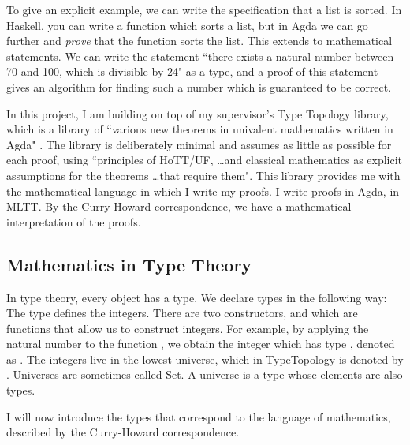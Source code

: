 \documentclass[ProjectReport]{subfiles}
\begin{document}
To give an explicit example, we can write the specification that a list is sorted. In Haskell, you can write a function which sorts a list, but in Agda we can go further and \textit{prove} that the function sorts the list. This extends to mathematical statements. We can write the statement ``there exists a natural number between 70 and 100, which is divisible by 24" as a type, and a proof of this statement gives an algorithm for finding such a number which is guaranteed to be correct.

In this project, I am building on top of my supervisor's Type Topology library, which is a library of ``various new theorems in univalent mathematics written in Agda" \cite{TypeTopology}. The library is deliberately minimal and assumes as little as possible for each proof, using ``principles of HoTT/UF, \ldots and classical mathematics as explicit assumptions for the theorems \ldots that require them". This library provides me with the mathematical language in which I write my proofs. I write proofs in Agda, in MLTT. By the Curry-Howard correspondence, we have a mathematical interpretation of the proofs.

\subsection{Mathematics in Type Theory}

In type theory, every object has a type. We declare types in the following way:
\TypeExample
The type  defines the integers. There are two constructors,  and  which are functions that allow us to construct integers. For example, by applying the natural number  to the function , we obtain the integer \AgdaSpace{} which has type , denoted as
\AgdaSpace{}%
\AgdaSymbol{:}\AgdaSpace{}%
.
The integers live in the lowest universe, which in TypeTopology is denoted by . Universes are sometimes called Set. A universe is a type whose elements are also types.

I will now introduce the types that correspond to the language of mathematics, described by the Curry-Howard correspondence. 
\end{document}
